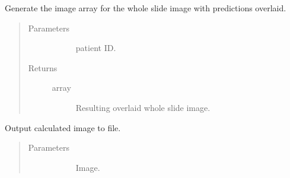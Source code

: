 \documentclass[letterpaper,10pt,english]{sphinxmanual}
\begin{document}
\begin{fulllineitems}
\begin{fulllineitems}
\end{fulllineitems}


\begin{fulllineitems}
\label{\detokenize{index:pathflowai.visualize.PredictionPlotter.generate_image}}
Generate the image array for the whole slide image with predictions overlaid.
\begin{quote}\begin{description}
\item[{Parameters}] \leavevmode\begin{description}
\item[{}] \leavevmode
patient ID.

\end{description}

\item[{Returns}] \leavevmode\begin{description}
\item[{array}] \leavevmode
Resulting overlaid whole slide image.

\end{description}

\end{description}\end{quote}

\end{fulllineitems}


\begin{fulllineitems}
\label{\detokenize{index:pathflowai.visualize.PredictionPlotter.output_image}}
Output calculated image to file.
\begin{quote}\begin{description}
\item[{Parameters}] \leavevmode\begin{description}
\item[{}] \leavevmode
Image.


\end{description}
\end{description}
\end{quote}
\end{fulllineitems}
\end{fulllineitems}
\end{document}
